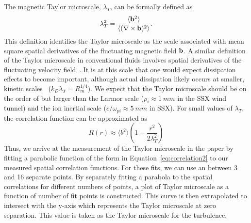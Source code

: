 \documentclass[aip,prl,amsmath,amssymb,reprint,superscriptaddress]{revtex4-1} %
\begin{document}
The magnetic Taylor microscale, $\lambda_{T}$, can be formally defined as
%
\begin{equation}
\lambda_T^2 = \frac{\langle {\bf b}^2 \rangle}{\langle (\nabla \times {\bf b})^2 \rangle}.
\label{eq:tayscale}
\end{equation}
%
This definition identifies the Taylor microscale as the scale associated with mean square spatial derivatives of the fluctuating magnetic field $\bf{b}$. A similar definition of the Taylor microscale in conventional fluids involves spatial derivatives of the fluctuating velocity field~\cite{frisch95}. It is at this scale that one would expect dissipation effects to become important, although actual dissipation likely occurs at smaller, kinetic scales~\cite{Mattaeus08} ($k_D \lambda_T = R_m^{1/4}$).  We expect that the Taylor microscale should be on the order of but larger than the Larmor scale ($\rho_i \approx 1~mm$ in the SSX wind tunnel) and the ion inertial scale ($c/\omega_{pi} \approx 5~mm$ in SSX). For small values of $\lambda_{T}$, the correlation function can be approximated as
%
\begin{equation}
R(r) \approx  \langle b^2 \rangle \left(1 - \frac{r^2}{2 \lambda_T^2}  \right)
\label{eq:correlation2} 
\end{equation}
%
Thus, we arrive at the measurement of the Taylor microscale in the paper by fitting a parabolic function of the form in Equation~\ref{eq:correlation2} to our measured spatial correlation functions. For these fits, we can use an between 3 and 16 separate points. By separately fitting a parabola to the spatial correlations for different numbers of points, a plot of Taylor microscale as a function of number of fit points is constructed. This curve is then extrapolated to intersect with the y-axis which represents the Taylor microscale at zero separation. This value is taken as the Taylor microscale for the turbulence.
\end{document}
